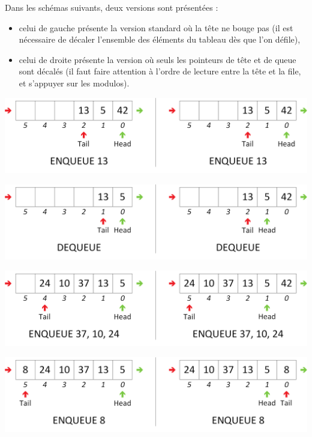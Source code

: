 \documentclass[11pt,a4paper]{article}
\begin{document}
\smallskip

Dans les schémas suivants, deux versions sont présentées :
\begin{itemize}
\item celui de gauche présente la version standard où la tête ne bouge pas (il est nécessaire de décaler l'ensemble des éléments du tableau dès que l'on défile),
\item celui de droite présente la version où seuls les pointeurs de tête et de queue sont décalés (il faut faire attention à l'ordre de lecture entre la tête et la file, et s'appuyer sur les modulos).
\end{itemize}

\begin{center}
\includegraphics[scale=0.65]{img/files/Files_6_Tableau_Statique_Usage_pack_2_double.png}
\end{center}

\begin{center}
\includegraphics[scale=0.65]{img/files/Files_6_Tableau_Statique_Usage_pack_3.png}
\end{center}

\begin{center}
\includegraphics[scale=0.65]{img/files/Files_6_Tableau_Statique_Usage_pack_4.png}
\end{center}

\begin{center}
\includegraphics[scale=0.65]{img/files/Files_6_Tableau_Statique_Usage_pack_5.png}
\end{center}
\end{document}

